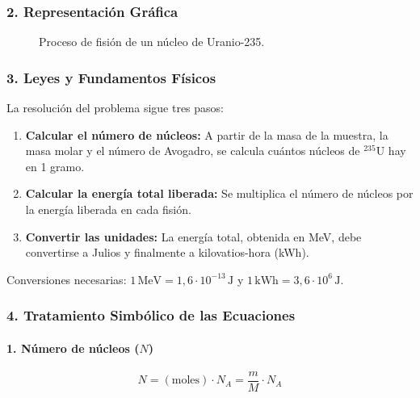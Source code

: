 \subsubsection*{2. Representación Gráfica}
\begin{figure}[H]
    \centering
    \caption{Proceso de fisión de un núcleo de Uranio-235.}
\end{figure}

\subsubsection*{3. Leyes y Fundamentos Físicos}
La resolución del problema sigue tres pasos:
\begin{enumerate}
    \item \textbf{Calcular el número de núcleos:} A partir de la masa de la muestra, la masa molar y el número de Avogadro, se calcula cuántos núcleos de ${}^{235}\text{U}$ hay en 1 gramo.
    \item \textbf{Calcular la energía total liberada:} Se multiplica el número de núcleos por la energía liberada en cada fisión.
    \item \textbf{Convertir las unidades:} La energía total, obtenida en MeV, debe convertirse a Julios y finalmente a kilovatios-hora (kWh).
\end{enumerate}
Conversiones necesarias: $1\,\text{MeV} = 1,6\cdot10^{-13}\,\text{J}$ y $1\,\text{kWh} = 3,6\cdot10^6\,\text{J}$.

\subsubsection*{4. Tratamiento Simbólico de las Ecuaciones}
\paragraph*{1. Número de núcleos ($N$)}
$$ N = (\text{moles}) \cdot N_A = \frac{m}{M} \cdot N_A $$

